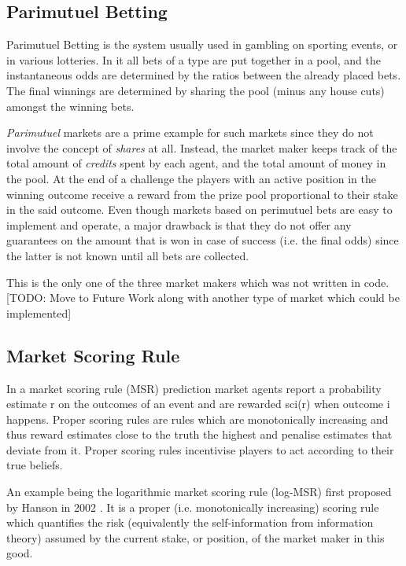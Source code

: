 \documentclass[bsc,frontabs,twoside,singlespacing,parskip,deptreport]{infthesis}     %
\begin{document}
    
\subsection{Parimutuel Betting}
Parimutuel Betting is the system usually used in gambling on sporting events, or in various lotteries. In it all bets of a type are put together in a pool, and the instantaneous odds are determined by the ratios between the already placed bets. The final winnings are determined by sharing the pool (minus any house cuts) amongst the winning bets.

{\em Parimutuel} markets are a prime example for such markets since they do not involve the concept of {\it shares} at all. Instead, the market maker keeps track of the total amount of {\it credits} spent by each agent, and the total amount of money in the pool. At the end of a challenge the players with an active position in the winning outcome receive a reward from the prize pool proportional to their stake in the said outcome.  Even though markets based on perimutuel bets are easy to implement and operate, a major drawback is that they do not offer any guarantees on the amount that is won in case of success (i.e. the final odds) since the latter is not known until all bets are collected. 

This is the only one of the three market makers which was not written in code. 
[TODO: Move to Future Work along with another type of market which could be implemented]

\subsection{Market Scoring Rule}

In a market scoring rule (MSR) prediction market agents report a probability estimate r on the outcomes of an event and are rewarded sci(r) when outcome i happens. Proper scoring rules are rules which are monotonically increasing and thus reward estimates close to the truth the highest and penalise estimates that deviate from it. Proper scoring rules incentivise players to act according to their true beliefs.

	An example being the logarithmic market scoring rule (log-MSR) first proposed by Hanson in 2002 \cite{hanson_logarithmic_2002}. It is a proper (i.e. monotonically increasing) scoring rule which quantifies the risk (equivalently the self-information from information theory) assumed by the current stake, or position, of the market maker in this good. 
\end{document}
